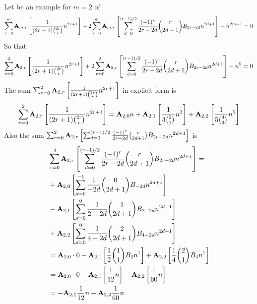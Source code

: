 Let be an example for $m=2$ of
\begin{equation*}
    \sum_{r=0}^{m} {\mathbf{A}} \sb{m,r} \left[ \frac{1}{(2r+1) \binom{2r}r} n^{2r+1} \right]
    + 2 \sum_{r=0}^{m} {\mathbf{A}} \sb{m,r} \left[ \sum_{d=0}^{(r-1)/2} \frac{(-1)^r}{2r-2d} \binom{r}{2d+1} {B}\sb{2r-2d} n^{2d+1} \right]
    - n^{2m+1} = 0
\end{equation*}
So that
\begin{equation*}
    \sum_{r=0}^{2} {\mathbf{A}} \sb{2,r} \left[ \frac{1}{(2r+1) \binom{2r}r} n^{2r+1} \right]
    + 2 \sum_{r=0}^{2} {\mathbf{A}} \sb{2,r} \left[ \sum_{d=0}^{(r-1)/2} \frac{(-1)^r}{2r-2d} \binom{r}{2d+1} {B}\sb{2r-2d} n^{2d+1} \right]
    - n^{5} = 0
\end{equation*}
The sum $\sum_{r=0}^{2} {\mathbf{A}} \sb{2,r} \left[ \frac{1}{(2r+1) \binom{2r}r} n^{2r+1} \right]$ in explicit form is
\begin{equation*}
    \sum_{r=0}^{2} {\mathbf{A}} \sb{2,r} \left[ \frac{1}{(2r+1) \binom{2r}r} n^{2r+1} \right] =
    {\mathbf{A}} \sb{2,0} n
    + {\mathbf{A}} \sb{2,1} \left[ \frac{1}{3 \binom{2}{1}} n^{3} \right]
    + {\mathbf{A}} \sb{2,2} \left[ \frac{1}{5 \binom{4}{2}} n^{5} \right]
\end{equation*}
Also the sum
$\sum_{r=0}^{2} {\mathbf{A}} \sb{2,r} \left[ \sum_{d=0}^{(r-1)/2} \frac{(-1)^r}{2r-2d} \binom{r}{2d+1} {B}\sb{2r-2d} n^{2d+1} \right]$
is
\begin{equation*}
    \begin{split}
        &\sum_{r=0}^{2} {\mathbf{A}} \sb{2,r} \left[ \sum_{d=0}^{(r-1)/2} \frac{(-1)^r}{2r-2d} \binom{r}{2d+1} {B}\sb{2r-2d} n^{2d+1} \right] = \\
        & + {\mathbf{A}} \sb{2,0} \left[ \sum_{d=0}^{-1} \frac{1}{-2d} \binom{0}{2d+1} {B}\sb{-2d} n^{2d+1} \right] \\
        & - {\mathbf{A}} \sb{2,1} \left[ \sum_{d=0}^{0} \frac{1}{2-2d} \binom{1}{2d+1} {B}\sb{2-2d} n^{2d+1} \right] \\
        & + {\mathbf{A}} \sb{2,2} \left[ \sum_{d=0}^{0} \frac{1}{4-2d} \binom{2}{2d+1} {B}\sb{4-2d} n^{2d+1} \right] \\
        & = {\mathbf{A}} \sb{2,0} \cdot 0
        - {\mathbf{A}} \sb{2,1} \left[ \frac{1}{2} \binom{1}{1} {B}\sb{2} n^{1} \right]
        + {\mathbf{A}} \sb{2,2} \left[ \frac{1}{4} \binom{2}{1} {B}\sb{4} n^{1} \right] \\
        & = {\mathbf{A}} \sb{2,0} \cdot 0
        - {\mathbf{A}} \sb{2,1} \left[ \frac{1}{12} n \right]
        - {\mathbf{A}} \sb{2,2} \left[ \frac{1}{60} n \right] \\
        & = - {\mathbf{A}} \sb{2,1} \frac{1}{12} n
        - {\mathbf{A}} \sb{2,2}  \frac{1}{60} n
    \end{split}
\end{equation*}
